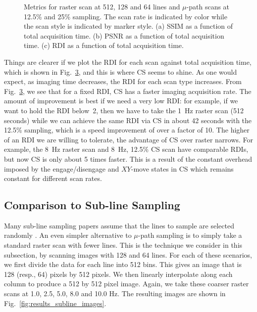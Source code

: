 \documentclass[journal]{IEEEtran}
\begin{document}
\begin{figure}[t!]
  \centering
  \begin{subfigure}{0.329\linewidth}
    \centering
    
    \caption{}
    \label{fig:time_ssim}
  \end{subfigure}
  \begin{subfigure}{0.329\linewidth}
    \centering
    
    \caption{}
    \label{fig:time_psnr}
  \end{subfigure}
  \begin{subfigure}{0.329\linewidth}
    \centering
    
    \caption{}
    \label{fig:time_damage}
  \end{subfigure}
  \caption{Metrics for raster scan at 512, 128 and 64 lines and
    $\mu$-path scans at 12.5\% and 25\% sampling. The scan rate is
    indicated by color while the scan style is indicated by marker
    style. (a) SSIM as a function of total acquisition time. (b) PSNR
    as a function of total acquisition time. (c) RDI as a function of
    total acquisition time.}
  \label{fig:time_vs_metrics}
\end{figure}


Things are clearer if we plot the RDI for each scan against total
acquisition time, which is shown in Fig.~\ref{fig:time_damage}, and
this is where CS seems to shine. As one would expect, as imaging time
decreases, the RDI for each scan type increases. From
Fig.~\ref{fig:time_damage}, we see that for a fixed RDI, CS has a
faster imaging acquisition rate. The amount of improvement is best if
we need a very low RDI: for example, if we want to hold the RDI below~2, then we have to take the 1~Hz raster scan (512 seconds) while we
can achieve the same RDI via CS in about 42 seconds with the 12.5\%
sampling, which is a speed improvement of over a factor of 10. The higher of an
RDI we are willing to tolerate, the advantage of CS over raster
narrows. For example, the 8~Hz raster scan and 8~Hz, 12.5\% CS scan
have comparable RDIs, but now CS is only about 5 times faster. This is
a result of the constant overhead imposed by the engage/disengage and
$XY$-move states in CS which remains constant for different scan
rates.

\subsection{Comparison to Sub-line Sampling} \label{sec:cp_subline}
Many sub-line sampling papers assume that the lines to sample are
selected randomly \cite{han_optimal_2018, Luo_nano_2015}. An even
simpler alternative to $\mu$-path sampling is to simply take a
standard raster scan with fewer lines. This is the technique we
consider in this subsection, by scanning images with 128 and 64 lines.
For each of these scenarios, we first divide the data for each line
into 512 bins. This gives an image that is 128 (resp., 64) pixels by
512 pixels. We then linearly interpolate along each column to produce
a 512 by 512 pixel image. Again, we take these coarser raster scans at
1.0, 2.5, 5.0, 8.0 and 10.0 Hz. The resulting images are shown in
Fig.~\ref{fig:results_subline_images}.
\end{document}

